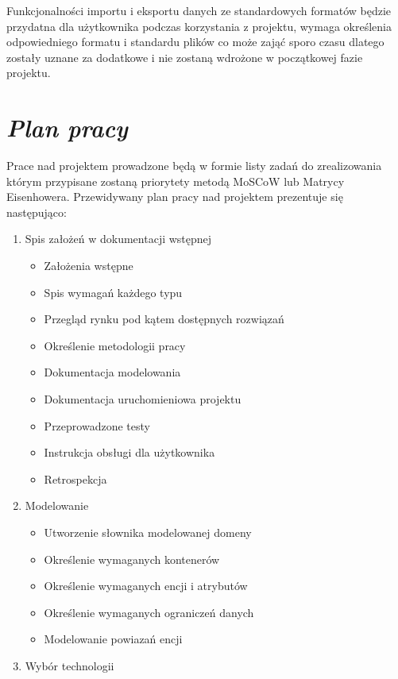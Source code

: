 \documentclass[a4paper,10pt]{report}
\newcommand{\customstylechapter}[1]{\large{\textit{#1}}}
\begin{document}
{Funkcjonalności importu i eksportu danych ze standardowych formatów będzie 
przydatna dla użytkownika podczas korzystania z projektu, wymaga określenia 
odpowiedniego formatu i standardu plików co może zająć sporo czasu dlatego 
zostały uznane za dodatkowe i nie zostaną wdrożone w początkowej fazie projektu.}
\chapter{\customstylechapter{Plan pracy}}
{Prace nad projektem prowadzone będą w formie listy zadań do zrealizowania 
którym przypisane zostaną priorytety metodą MoSCoW \cite{MOSCOW} lub Matrycy 
Eisenhowera. Przewidywany plan pracy nad projektem prezentuje się następująco:
\begin{enumerate}
    \item Spis założeń w dokumentacji wstępnej
    \begin{itemize}
        \item Założenia wstępne
        \item Spis wymagań każdego typu
        \item Przegląd rynku pod kątem dostępnych rozwiązań
        \item Określenie metodologii pracy
        \item Dokumentacja modelowania
        \item Dokumentacja uruchomieniowa projektu
        \item Przeprowadzone testy
        \item Instrukcja obsługi dla użytkownika
        \item Retrospekcja
    \end{itemize}
    \item Modelowanie 
    \begin{itemize}
        \item Utworzenie słownika modelowanej domeny
        \item Określenie wymaganych kontenerów
        \item Określenie wymaganych encji i atrybutów
        \item Określenie wymaganych ograniczeń danych
        \item Modelowanie powiazań encji
    \end{itemize}
    \item Wybór technologii

\end{enumerate}}
\end{document}
